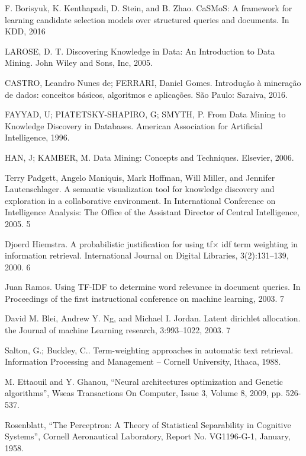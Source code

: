 \documentclass[conference]{IEEEtran}
\begin{document}
\begin{thebibliography}{00}

 F. Borisyuk, K. Kenthapadi, D. Stein, and B. Zhao. CaSMoS: A framework for
learning candidate selection models over structured queries and documents. In
KDD, 2016

 LAROSE, D. T. Discovering Knowledge in Data: An Introduction to Data Mining.
John Wiley and Sons, Inc, 2005.

 CASTRO, Leandro Nunes de; FERRARI, Daniel Gomes. Introdução à mineração de
dados: conceitos básicos, algoritmos e aplicações. São Paulo: Saraiva, 2016.

 FAYYAD, U; PIATETSKY-SHAPIRO, G; SMYTH, P. From Data Mining to Knowledge Discovery in Databases. American Association for Artificial Intelligence, 1996.

 HAN, J; KAMBER, M. Data Mining: Concepts and Techniques. Elsevier, 2006.

 Terry Padgett, Angelo Maniquis, Mark Hoffman, Will Miller, and Jennifer Lautenschlager. A semantic visualization tool for knowledge discovery and exploration in a
collaborative environment. In International Conference on Intelligence Analysis: The
Office of the Assistant Director of Central Intelligence, 2005. 5 

 Djoerd Hiemstra. A probabilistic justification for using tf$\times$ idf term weighting
in information retrieval. International Journal on Digital Libraries, 3(2):131–139,
2000. 6

 Juan Ramos. Using TF-IDF to determine word relevance in document queries.
In Proceedings of the first instructional conference on machine learning, 2003. 7

 David M. Blei, Andrew Y. Ng, and Michael I. Jordan. Latent dirichlet allocation.
the Journal of machine Learning research, 3:993–1022, 2003. 7

 Salton, G.; Buckley, C.. Term-weighting approaches in automatic text retrieval.
Information Processing and Management – Cornell University, Ithaca, 1988.

 M. Ettaouil and Y. Ghanou, “Neural architectures optimization and Genetic algorithms”, Wseas Transactions On Computer, Issue 3, Volume 8, 2009, pp. 526-537. 

 Rosenblatt, “The Perceptron: A Theory of Statistical Separability in Cognitive Systems”, Cornell Aeronautical Laboratory, Report No. VG1196-G-1, January, 1958. 


\end{thebibliography}
\end{document}
